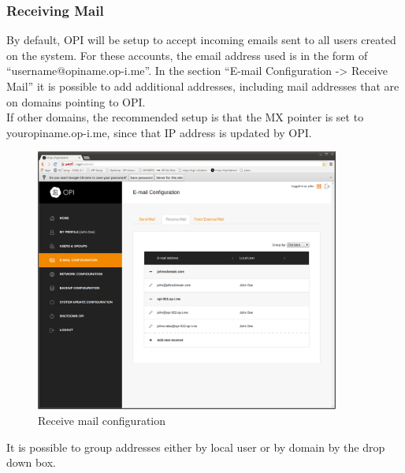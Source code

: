 \documentclass[12pt,a4paper,titlepage]{article}
\begin{document}
\subsubsection{Receiving Mail}
By default, OPI will be setup to accept incoming emails sent to all users created on the system. For these accounts, the email address used is in the form of ``username@opiname.op-i.me''. In the section ``E-mail Configuration -> Receive Mail'' it is possible to add additional addresses, including mail addresses that are on domains pointing to OPI.\\
If other domains, the recommended setup is that the MX pointer is set to youropiname.op-i.me, since that IP address is updated by OPI.
\begin{figure}[h]
\centering
\includegraphics[width=10cm]{./img/receive-mail}
\caption{Receive mail configuration}
\end{figure}

It is possible to group addresses either by local user or by domain by the drop down box.
\end{document}
